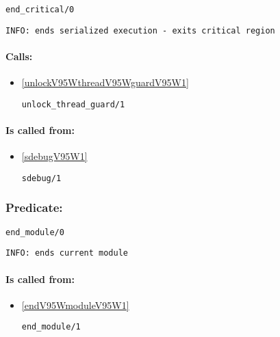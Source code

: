 \begin{verbatim}
end_critical/0
\end{verbatim}

{\small \begin{verbatim}
INFO: ends serialized execution - exits critical region

\end{verbatim}}
\paragraph{Calls:} 
\begin{itemize}
\item \ref{unlockV95WthreadV95WguardV95W1} 
\begin{verbatim}
unlock_thread_guard/1
\end{verbatim}

\end{itemize}
\paragraph{Is called from:} 
\begin{itemize}
\item \ref{sdebugV95W1} 
\begin{verbatim}
sdebug/1
\end{verbatim}

\end{itemize}

\subsubsection{Predicate:} \label{endV95WmoduleV95W0}

\begin{verbatim}
end_module/0
\end{verbatim}

{\small \begin{verbatim}
INFO: ends current module

\end{verbatim}}
\paragraph{Is called from:} 
\begin{itemize}
\item \ref{endV95WmoduleV95W1} 
\begin{verbatim}
end_module/1
\end{verbatim}

\end{itemize}

